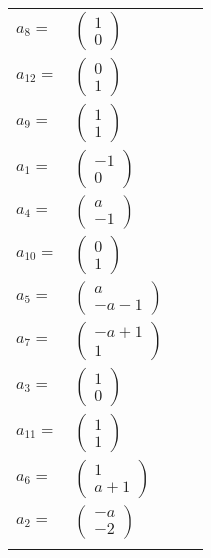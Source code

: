 \documentclass[1p]{elsarticle_modified}
\theoremstyle{definition}
\begin{document}
\begin{tabular}{m{7pt} m{180pt} m{7pt} m{180pt} }
\flushright $a_{8}=$&$\begin{pmatrix}1\\0\end{pmatrix}$ \\
\flushright $a_{12}=$&$\begin{pmatrix}0\\1\end{pmatrix}$ \\
\flushright $a_{9}=$&$\begin{pmatrix}1\\1\end{pmatrix}$ \\
\flushright $a_{1}=$&$\begin{pmatrix}-1\\0\end{pmatrix}$ \\
\flushright $a_{4}=$&$\begin{pmatrix}a\\-1\end{pmatrix}$ \\
\flushright $a_{10}=$&$\begin{pmatrix}0\\1\end{pmatrix}$ \\
\flushright $a_{5}=$&$\begin{pmatrix}a\\- a-1\end{pmatrix}$ \\
\flushright $a_{7}=$&$\begin{pmatrix}- a+1\\1\end{pmatrix}$ \\
\flushright $a_{3}=$&$\begin{pmatrix}1\\0\end{pmatrix}$ \\
\flushright $a_{11}=$&$\begin{pmatrix}1\\1\end{pmatrix}$ \\
\flushright $a_{6}=$&$\begin{pmatrix}1\\a+1\end{pmatrix}$ \\
\flushright $a_{2}=$&$\begin{pmatrix}- a\\-2\end{pmatrix}$\\&\end{tabular}
\end{document}
